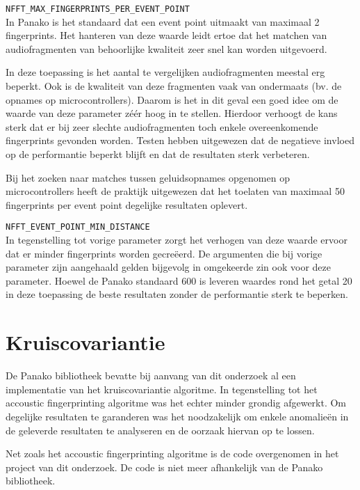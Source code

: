 \begin{description}
	\item\texttt{NFFT\_MAX\_FINGERPRINTS\_PER\_EVENT\_POINT} \hfill \\
	In Panako is het standaard dat een event point uitmaakt van maximaal 2 fingerprints. Het hanteren van deze waarde leidt ertoe dat het matchen van audiofragmenten van behoorlijke kwaliteit zeer snel kan worden uitgevoerd. 
	
	In deze toepassing is het aantal te vergelijken audiofragmenten meestal erg beperkt. Ook is de kwaliteit van deze fragmenten vaak van ondermaats (bv. de opnames op microcontrollers). Daarom is het in dit geval een goed idee om de waarde van deze parameter zéér hoog in te stellen. Hierdoor verhoogt de kans sterk dat er bij zeer slechte audiofragmenten toch enkele overeenkomende fingerprints gevonden worden. Testen hebben uitgewezen dat de negatieve invloed op de performantie beperkt blijft en dat de resultaten sterk verbeteren. 
	
	Bij het zoeken naar matches tussen geluidsopnames opgenomen op microcontrollers heeft de praktijk uitgewezen dat het toelaten van maximaal 50 fingerprints per event point degelijke resultaten oplevert.
	
	\item\texttt{NFFT\_EVENT\_POINT\_MIN\_DISTANCE} \hfill \\
	In tegenstelling tot vorige parameter zorgt het verhogen van deze waarde ervoor dat er minder fingerprints worden gecreëerd. De argumenten die bij vorige parameter zijn aangehaald gelden bijgevolg in omgekeerde zin ook voor deze parameter. Hoewel de Panako standaard 600 is leveren waardes rond het getal 20 in deze toepassing de beste resultaten zonder de performantie sterk te beperken.
	
	
\end{description}


\section{Kruiscovariantie}

De Panako bibliotheek bevatte bij aanvang van dit onderzoek al een implementatie van het kruiscovariantie algoritme. In tegenstelling tot het accoustic fingerprinting algoritme was het echter minder grondig afgewerkt. Om degelijke resultaten te garanderen was het noodzakelijk om enkele anomalieën in de geleverde resultaten te analyseren en de oorzaak hiervan op te lossen.

Net zoals het accoustic fingerprinting algoritme is de code overgenomen in het project van dit onderzoek. De code is niet meer afhankelijk van de Panako bibliotheek.

